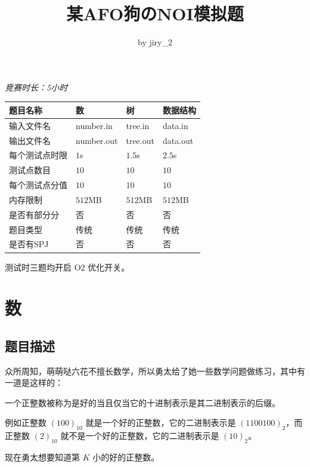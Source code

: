 \documentclass[11pt, a4paper]{article}
\title{某AFO狗のNOI模拟题}
\author{by jiry\_2}
\begin{document}
\maketitle

\begin{center}
\emph{竞赛时长：5小时}
\end{center}
\begin{center}
\begin{tabular}{|l|p{70pt}|p{70pt}|p{70pt}|}
	\hline
	题目名称 & 数 & 树 & 数据结构\\
	\hline
	输入文件名 & number.in & tree.in & data.in \\
	\hline
	输出文件名 & number.out & tree.out & data.out \\
	\hline
	每个测试点时限 & $1$s & $1.5$s & $2.5$s\\
	\hline
	测试点数目 & $10$ & $10$ & $10$\\
	\hline
	每个测试点分值 & $10$ & $10$ & $10$\\
	\hline
	内存限制 & $512$MB & $512$MB & $512$MB\\
	\hline
	是否有部分分 & 否 & 否 & 否\\
	\hline
	题目类型 & 传统 & 传统 & 传统\\
	\hline
	是否有SPJ & 否&否 &否 \\
     \hline
\end{tabular}

测试时三题均开启 O2 优化开关。

\end{center}
\begin{center}
\end{center}

\newpage
\section{数}

\subsection{题目描述}
众所周知，萌萌哒六花不擅长数学，所以勇太给了她一些数学问题做练习，其中有一道是这样的：

一个正整数被称为是好的当且仅当它的十进制表示是其二进制表示的后缀。

例如正整数 $(100)_{10}$ 就是一个好的正整数，它的二进制表示是 $(1100100)_2$，而正整数 $(2)_{10}$ 就不是一个好的正整数，它的二进制表示是 $(10)_2$。

现在勇太想要知道第 $K$ 小的好的正整数。
\end{document}
